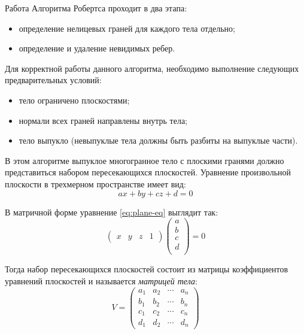 Работа Алгоритма Робертса проходит в два этапа:
\begin{itemize}[label=--]
	\item определение нелицевых граней для каждого тела отдельно;
	\item определение и удаление невидимых ребер.
\end{itemize}

Для корректной работы данного алгоритма, необходимо выполнение следующих предварительных условий:
\begin{itemize}[label=--]
	\item тело ограничено плоскостями;
	\item нормали всех граней направлены внутрь тела;
	\item тело выпукло (невыпуклые тела должны быть разбиты на выпуклые части).
\end{itemize}

В этом алгоритме выпуклое многогранное тело с плоскими гранями должно представиться набором пересекающихся плоскостей. Уравнение произвольной плоскости в трехмерном пространстве имеет вид:
\begin{equation}
	ax + by + cz + d = 0
	\label{eq:plane-eq}
\end{equation}

В матричной форме уравнение \ref{eq:plane-eq} выглядит так:
\begin{equation}
	\begin{pmatrix}
		x & y & z & 1
	\end{pmatrix}
	\begin{pmatrix}
		a \\
		b \\
		c \\
		d \\
	\end{pmatrix}
	= 0
	\label{eq:matrix-plane-eq1}
\end{equation}

Тогда набор пересекающихся плоскостей состоит из матрицы коэффициентов уравнений плоскостей и называется \textit{матрицей тела}:
\begin{equation}
	V = 
	\begin{pmatrix}
		a_1 & a_2 & \cdots & a_n \\
		b_1 & b_2 & \cdots & b_n \\
		c_1 & c_2 & \cdots & c_n \\
		d_1 & d_2 & \cdots & d_n
	\end{pmatrix}
	\label{eq:model-matrix}
\end{equation}


